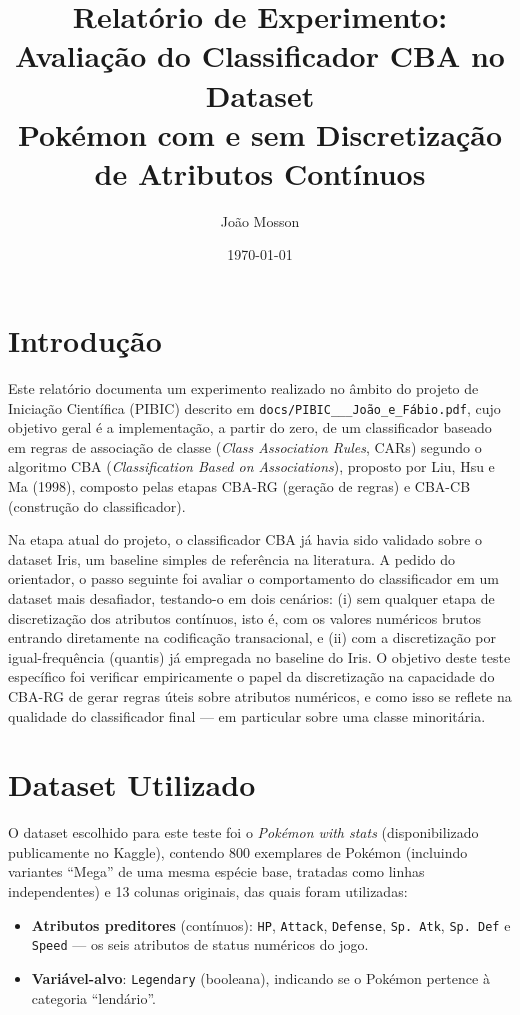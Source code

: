 \documentclass[a4paper,11pt]{article}
\title{Relatório de Experimento: Avaliação do Classificador CBA no Dataset\\ Pokémon com e sem Discretização de Atributos Contínuos}
\author{João Mosson}
\date{\today}
\begin{document}
\maketitle

\section{Introdução}

Este relatório documenta um experimento realizado no âmbito do projeto de
Iniciação Científica (PIBIC) descrito em
\texttt{docs/PIBIC\_\_\_João\_e\_Fábio.pdf}, cujo objetivo geral é a
implementação, a partir do zero, de um classificador baseado em regras de
associação de classe (\emph{Class Association Rules}, CARs) segundo o
algoritmo CBA (\emph{Classification Based on Associations}), proposto por
Liu, Hsu e Ma (1998), composto pelas etapas CBA-RG (geração de regras) e
CBA-CB (construção do classificador).

Na etapa atual do projeto, o classificador CBA já havia sido validado sobre
o dataset Iris, um baseline simples de referência na literatura. A pedido do
orientador, o passo seguinte foi avaliar o comportamento do classificador em
um dataset mais desafiador, testando-o em dois cenários: (i) sem qualquer
etapa de discretização dos atributos contínuos, isto é, com os valores
numéricos brutos entrando diretamente na codificação transacional, e (ii)
com a discretização por igual-frequência (quantis) já empregada no baseline
do Iris. O objetivo deste teste específico foi verificar empiricamente o
papel da discretização na capacidade do CBA-RG de gerar regras úteis sobre
atributos numéricos, e como isso se reflete na qualidade do classificador
final — em particular sobre uma classe minoritária.

\section{Dataset Utilizado}

O dataset escolhido para este teste foi o \emph{Pokémon with stats}
(disponibilizado publicamente no Kaggle), contendo 800 exemplares de
Pokémon (incluindo variantes ``Mega'' de uma mesma espécie base, tratadas
como linhas independentes) e 13 colunas originais, das quais foram
utilizadas:

\begin{itemize}
    \item \textbf{Atributos preditores} (contínuos): \texttt{HP},
    \texttt{Attack}, \texttt{Defense}, \texttt{Sp.\ Atk}, \texttt{Sp.\ Def}
    e \texttt{Speed} — os seis atributos de status numéricos do jogo.
    \item \textbf{Variável-alvo}: \texttt{Legendary} (booleana), indicando
    se o Pokémon pertence à categoria ``lendário''.
\end{itemize}
\end{document}

